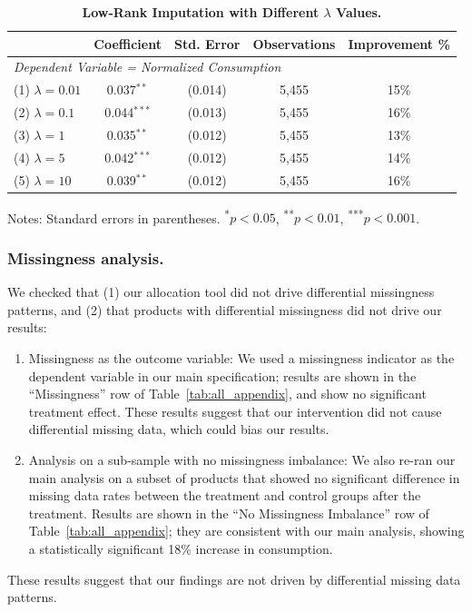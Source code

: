 \documentclass[12pt]{article}
\begin{document}
\begin{table}[t]
\caption{\textbf{Low-Rank Imputation with Different $\lambda$ Values.}}
\label{tab:lambda_robustness}
\centering
\begin{threeparttable}
\begin{tabular}{lcccc}
\toprule
 & \textbf{Coefficient} & \textbf{Std. Error} & \textbf{Observations} & \textbf{Improvement \%} \\
\midrule
\multicolumn{5}{l}{\textit{Dependent Variable = Normalized Consumption}} \\
\midrule
(1) $\lambda = 0.01$ & 0.037$^{**}$ & (0.014) & 5,455 & 15\% \\
(2) $\lambda = 0.1$  & 0.044$^{***}$ & (0.013) & 5,455 & 16\% \\
(3) $\lambda = 1$    & 0.035$^{**}$ & (0.012) & 5,455 & 13\% \\
(4) $\lambda = 5$    & 0.042$^{***}$ & (0.012) & 5,455 & 14\% \\
(5) $\lambda = 10$   & 0.039$^{**}$ & (0.012) & 5,455 & 16\% \\
\bottomrule
\end{tabular}
\begin{tablenotes}
\footnotesize
\item Notes: Standard errors in parentheses. \textsuperscript{*}$p < 0.05$, \textsuperscript{**}$p < 0.01$, \textsuperscript{***}$p < 0.001$.
\end{tablenotes}
\end{threeparttable}
\end{table}


\subsubsection{Missingness analysis.} \label{ssec:missingness}

We checked that (1) our allocation tool did not drive differential missingness patterns, and (2) that products with differential missingness did not drive our results:
\begin{enumerate}
\item Missingness as the outcome variable: We used a missingness indicator as the dependent variable in our main specification; results are shown in the ``Missingness'' row of Table~\ref{tab:all_appendix}, and show no significant treatment effect. These results suggest that our intervention did not cause differential missing data, which could bias our results.
\item Analysis on a sub-sample with no missingness imbalance: We also re-ran our main analysis on a subset of products that showed no significant difference in missing data rates between the treatment and control groups after the treatment. Results are shown in the ``No Missingness Imbalance'' row of Table~\ref{tab:all_appendix}; they are consistent with our main analysis, showing a statistically significant 18\% increase in consumption.
\end{enumerate}
These results suggest that our findings are not driven by differential missing data patterns.
\end{document}
